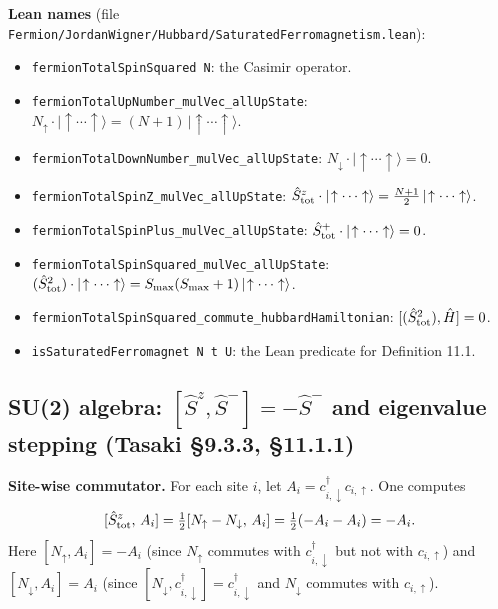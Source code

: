 \documentclass[a4paper,11pt]{article}
\begin{document}
\noindent\textbf{Lean names}
(file \texttt{Fermion/JordanWigner/Hubbard/SaturatedFerromagnetism.lean}):
\begin{itemize}
  \item \texttt{fermionTotalSpinSquared N}: the Casimir operator.
  \item \texttt{fermionTotalUpNumber\_mulVec\_allUpState}:
    $N_\uparrow\cdot|\!\uparrow\cdots\uparrow\rangle = (N+1)\,|\!\uparrow\cdots\uparrow\rangle$.
  \item \texttt{fermionTotalDownNumber\_mulVec\_allUpState}:
    $N_\downarrow\cdot|\!\uparrow\cdots\uparrow\rangle = 0$.
  \item \texttt{fermionTotalSpinZ\_mulVec\_allUpState}:
    $\hat{S}^z_{\rm tot}\cdot|\!\uparrow\cdots\uparrow\rangle
      = \frac{N+1}{2}\,|\!\uparrow\cdots\uparrow\rangle$.
  \item \texttt{fermionTotalSpinPlus\_mulVec\_allUpState}:
    $\hat{S}^+_{\rm tot}\cdot|\!\uparrow\cdots\uparrow\rangle = 0$.
  \item \texttt{fermionTotalSpinSquared\_mulVec\_allUpState}:
    $(\hat{S}^2_{\rm tot})\cdot|\!\uparrow\cdots\uparrow\rangle
      = S_{\max}(S_{\max}+1)\,|\!\uparrow\cdots\uparrow\rangle$.
  \item \texttt{fermionTotalSpinSquared\_commute\_hubbardHamiltonian}:
    $[(\hat{S}^2_{\rm tot}),\hat H] = 0$.
  \item \texttt{isSaturatedFerromagnet N t U}: the Lean predicate for
    Definition 11.1.
\end{itemize}

\subsection{SU(2) algebra: \([\hat S^z,\hat S^-]=-\hat S^-\) and eigenvalue stepping (Tasaki §9.3.3, §11.1.1)}
\label{subsec:hubbard-su2-algebra}

\noindent\textbf{Site-wise commutator.}
For each site $i$, let $A_i = c^\dagger_{i,\downarrow}c_{i,\uparrow}$.
One computes
\[
  [\hat S^z_{\rm tot},\,A_i]
  = \tfrac{1}{2}[N_\uparrow - N_\downarrow,\,A_i]
  = \tfrac{1}{2}(-A_i - A_i) = -A_i.
\]
Here $[N_\uparrow, A_i] = -A_i$ (since $N_\uparrow$ commutes with
$c^\dagger_{i,\downarrow}$ but not with $c_{i,\uparrow}$) and
$[N_\downarrow, A_i] = A_i$ (since $[N_\downarrow, c^\dagger_{i,\downarrow}] = c^\dagger_{i,\downarrow}$
and $N_\downarrow$ commutes with $c_{i,\uparrow}$).
\end{document}
